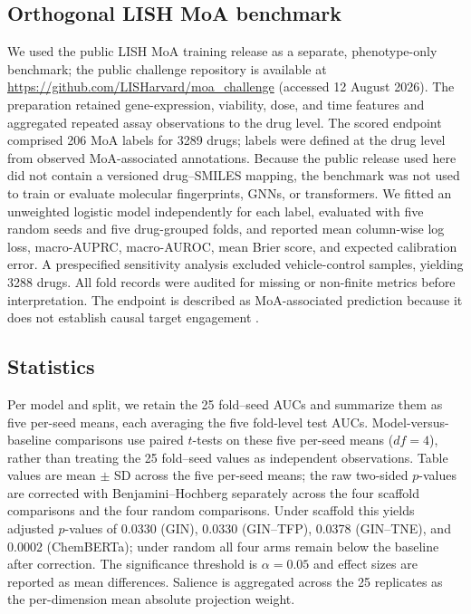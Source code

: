 \documentclass[11pt,a4paper]{article}
\begin{document}
\subsection{Orthogonal LISH MoA benchmark}

We used the public LISH MoA training release as a separate, phenotype-only benchmark; the public challenge repository is available at \url{https://github.com/LISHarvard/moa_challenge} (accessed 12 August 2026). The preparation retained gene-expression, viability, dose, and time features and aggregated repeated assay observations to the drug level. The scored endpoint comprised \num{206} MoA labels for \num{3289} drugs; labels were defined at the drug level from observed MoA-associated annotations. Because the public release used here did not contain a versioned drug--SMILES mapping, the benchmark was not used to train or evaluate molecular fingerprints, GNNs, or transformers. We fitted an unweighted logistic model independently for each label, evaluated with five random seeds and five drug-grouped folds, and reported mean column-wise log loss, macro-AUPRC, macro-AUROC, mean Brier score, and expected calibration error. A prespecified sensitivity analysis excluded vehicle-control samples, yielding \num{3288} drugs. All fold records were audited for missing or non-finite metrics before interpretation. The endpoint is described as MoA-associated prediction because it does not establish causal target engagement \citep{Trapotsi2022MoA}.

\subsection{Statistics}

Per model and split, we retain the \num{25} fold--seed AUCs and summarize them as five per-seed means, each averaging the five fold-level test AUCs. Model-versus-baseline comparisons use paired $t$-tests on these five per-seed means ($df=4$), rather than treating the \num{25} fold--seed values as independent observations. Table values are mean $\pm$ SD across the five per-seed means; the raw two-sided $p$-values are corrected with Benjamini--Hochberg separately across the four scaffold comparisons and the four random comparisons. Under scaffold this yields adjusted $p$-values of \num{0.0330} (GIN), \num{0.0330} (GIN--TFP), \num{0.0378} (GIN--TNE), and \num{0.0002} (ChemBERTa); under random all four arms remain below the baseline after correction. The significance threshold is $\alpha=\num{0.05}$ and effect sizes are reported as mean differences. Salience is aggregated across the \num{25} replicates as the per-dimension mean absolute projection weight.
\end{document}
